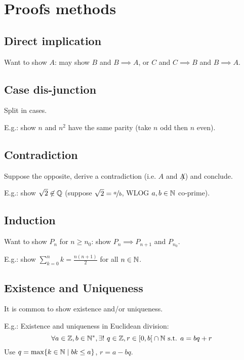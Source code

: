 \chapter{Proofs methods}

\section{Direct implication}
Want to show $A$: may show $B$ and $B \implies A$, or $C$ and $C \implies B$ and $B \implies A$.

\section{Case dis-junction}
Split in cases.

E.g.: show $n$ and $n^2$ have the same parity (take $n$ odd then $n$ even).

\section{Contradiction}
Suppose the opposite, derive a contradiction (i.e. $A$ and $\not A$) and conclude.

E.g.: show $\sqrt{2} \not\in \mathbb{Q}$ (suppose $\sqrt{2}=\nicefrac{a}{b}$, WLOG $a,b \in \mathbb{N}$ co-prime).

\section{Induction}
Want to show $P_n$ for $n \geq n_0$: show $P_n \implies P_{n+1}$ and $P_{n_0}$.

E.g.: show $\sum_{k=0}^{n} k = \frac{n(n+1)}{2}$ for all $n \in \mathbb{N}$.

\section{Existence and Uniqueness}
It is common to show existence and/or uniqueness.

E.g.: Existence and uniqueness in Euclidean division: 
$$\forall a \in \mathbb{Z}, b \in \mathbb{N}^*, \exists ! \ q \in \mathbb{Z}, r \in \left[ 0, b \right[ \cap \mathbb{N} \text{ s.t. } a=bq+r$$
Use $q = \max\{ k \in \mathbb{N} \mid bk \leq a \}$, $r = a-bq$.
